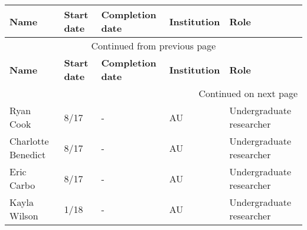 \begin{longtable}[l]{ @{} p{1.2in} p{0.5in} p{0.8in}p{0.75in} p{2in} @{} }
    \hline
    \textbf{Name} & \textbf{Start date} & \textbf{Completion date} & \textbf{Institution} & \textbf{Role} \\
    \hline
    \endfirsthead
    \multicolumn{5}{c}{{Continued from previous page}} \\
    \hline
    \textbf{Name} & \textbf{Start date} & \textbf{Completion date} & \textbf{Institution} & \textbf{Role} \\
    \hline
    \endhead
    \hline \multicolumn{5}{r}{{Continued on next page}} \\
    \endfoot
    \hline
    \endlastfoot
    Ryan Cook & 8/17 & - & AU & Undergraduate researcher \\
    Charlotte Benedict & 8/17 & - & AU & Undergraduate researcher \\
    Eric Carbo & 8/17 & - & AU & Undergraduate researcher \\
    Kayla Wilson & 1/18 & - & AU & Undergraduate researcher \\
\end{longtable}

